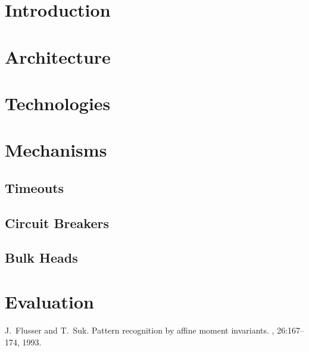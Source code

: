 \documentclass{sciposter}
\begin{document}
\begin{multicols}{3}

\begin{abstract}
\lipsum[1]
\end{abstract}

\section{Introduction}

\lipsum[1-2]

\section{Architecture}
\lipsum[1]

\section{Technologies}
\lipsum[1]

\section{Mechanisms}
\subsection{Timeouts}
\lipsum[1]

\subsection{Circuit Breakers}
\lipsum[1]

\subsection{Bulk Heads}
\lipsum[1]

\section{Evaluation}
\lipsum[1-2]




\begin{thebibliography}{1}

J.~Flusser and T.~Suk.
\newblock Pattern recognition by affine moment invariants.
, 26:167--174, 1993.

\end{thebibliography}

\end{multicols}
\end{document}
